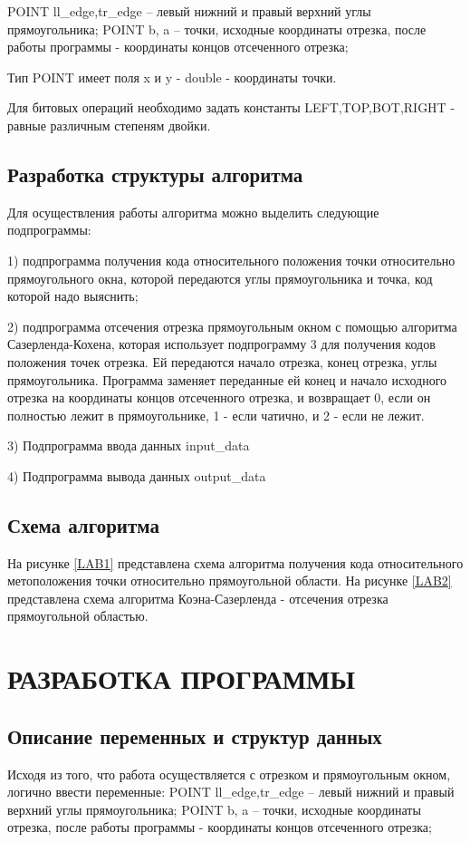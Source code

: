 POINT ll\_edge,tr\_edge – левый нижний и правый верхний углы прямоугольника;
POINT b, a – точки, исходные координаты отрезка, после работы программы - координаты концов отсеченного отрезка;

Тип POINT имеет поля x и y - double - координаты точки.

Для битовых операций необходимо задать константы LEFT,TOP,BOT,RIGHT - равные различным степеням двойки.

\subsection{Разработка структуры алгоритма}
Для осуществления работы алгоритма можно выделить следующие
подпрограммы:

1) подпрограмма получения кода относительного положения точки
относительно прямоугольного окна, которой передаются углы прямоугольника и точка, код которой надо выяснить;

2) подпрограмма отсечения отрезка прямоугольным окном с помощью
алгоритма Сазерленда-Кохена, которая использует подпрограмму 3 для получения кодов положения точек отрезка. Ей передаются
начало отрезка, конец отрезка, углы прямоугольника. Программа заменяет переданные ей конец и начало исходного отрезка на координаты концов отсеченного отрезка, и возвращает 0, если он полностью лежит в прямоугольнике, 1 - если чатично, и 2 - если не лежит.

3) Подпрограмма ввода данных input\_data

4) Подпрограмма вывода данных output\_data
\subsection{Схема алгоритма}
На рисунке \ref{LAB1} представлена схема алгоритма получения кода относительного метоположения точки относительно прямоугольной области.
На рисунке \ref{LAB2} представлена схема алгоритма Коэна-Сазерленда - отсечения отрезка прямоугольной областью.
\section{РАЗРАБОТКА ПРОГРАММЫ}
\subsection{Описание переменных и структур данных}
Исходя из того, что работа осуществляется с отрезком и прямоугольным
окном, логично ввести переменные:
POINT ll\_edge,tr\_edge – левый нижний и правый верхний углы прямоугольника;
POINT b, a – точки, исходные координаты отрезка, после работы программы - координаты концов отсеченного отрезка;


